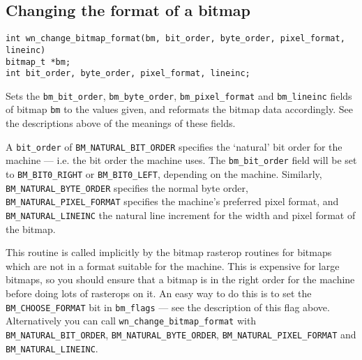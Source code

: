 \subsection{Changing the format of a bitmap}
\begin{verbatim}
int wn_change_bitmap_format(bm, bit_order, byte_order, pixel_format, lineinc)
bitmap_t *bm;
int bit_order, byte_order, pixel_format, lineinc;
\end{verbatim}
Sets the {\tt bm\_bit\_order}, {\tt bm\_byte\_order},
{\tt bm\_pixel\_format} and {\tt bm\_lineinc}
fields of bitmap {\tt bm} to the values given, and reformats the bitmap
data accordingly.
See the descriptions above of the meanings of these fields.

A {\tt bit\_order} of {\tt BM\_NATURAL\_BIT\_ORDER} specifies the `natural' bit
order for the machine --- i.e. the bit order the machine uses.
The {\tt bm\_bit\_order} field will be set to {\tt BM\_BIT0\_RIGHT} or
{\tt BM\_BIT0\_LEFT}, depending on the machine.
Similarly, {\tt BM\_NATURAL\_BYTE\_ORDER} specifies the normal
byte order, {\tt BM\_NATURAL\_PIXEL\_FORMAT} specifies the machine's preferred
pixel format, and {\tt BM\_NATURAL\_LINEINC} the natural line increment for
the width and pixel format of the bitmap.

This routine is called implicitly by the bitmap rasterop routines for
bitmaps which are not in a format suitable for the machine.
This is expensive for large bitmaps, so you should ensure that a bitmap is
in the right order for the machine before doing lots of rasterops on it.
An easy way to do this is to set the {\tt BM\_CHOOSE\_FORMAT} bit in
{\tt bm\_flags} --- see the description of this flag above.
Alternatively you can call {\tt wn\_change\_bitmap\_format} with
{\tt BM\_NATURAL\_BIT\_ORDER}, {\tt BM\_NATURAL\_BYTE\_ORDER},
{\tt BM\_NATURAL\_PIXEL\_FORMAT} and {\tt BM\_NATURAL\_LINEINC}.
